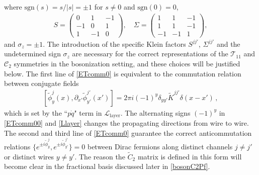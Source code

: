 where $\mathrm{sgn}(s)=s/|s|=\pm1$ for $s\neq0$ and $\mathrm{sgn}(0)=0$, \begin{align}S=\left(\begin{smallmatrix}0&1&-1\\-1&0&1\\1&-1&0\end{smallmatrix}\right),\quad\Sigma=\left(\begin{smallmatrix}1&1&-1\\1&1&-1\\-1&-1&1\end{smallmatrix}\right),\label{Kleinfactors}\end{align} and $\sigma_z=\pm1$. The introduction of the specific Klein factors $S^{jj'}$, $\Sigma^{jj'}$ and the undetermined sign $\sigma_z$ are necessary for the correct representations of the $\mathcal{T}_{11}$ and $\mathcal{C}_2$ symmetries in the bosonization setting, and these choices will be justified below. The first line of \eqref{ETcomm0} is equivalent to the commutation relation between conjugate fields \begin{align}\left[\tilde\phi_y^j(x),\partial_{x'}\tilde\phi_{y'}^{j'}(x')\right]=2\pi i(-1)^y\delta_{yy'}\tilde{K}^{jj'}\delta(x-x') \,, \label{ETcomm00}\end{align} which is set by the ``$p\dot{q}$" term in $\mathcal{L}_{\mathrm{layer}}$. The alternating signs $(-1)^y$ in \eqref{ETcomm00} and \eqref{Llayer} changes the propagating directions from wire to wire. The second and third line of \eqref{ETcomm0} guarantee the correct anticommutation relations $\{e^{\pm i\tilde\phi^j_y},e^{\pm i\tilde\phi^{j'}_{y'}}\}=0$ between Dirac fermions along distinct channels $j\neq j'$ or distinct wires $y\neq y'$. The reason the $\tilde{C}_2$ matrix is defined in this form will become clear in the fractional basis discussed later in \eqref{bosonC2Pf}.


